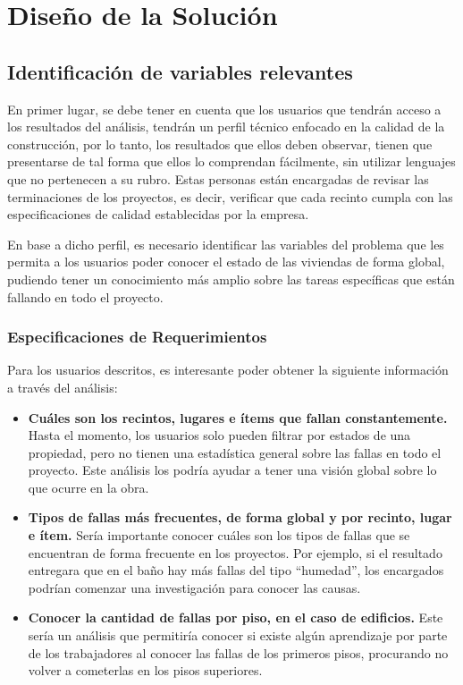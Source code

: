 \documentclass[letter,12pt,oneside]{report}
\begin{document}
\newpage
\chapter{Diseño de la Solución}

\section{Identificación de variables relevantes}
En primer lugar, se debe tener en cuenta que los usuarios que tendrán acceso a los resultados del análisis, tendrán un perfil técnico enfocado en la calidad de la construcción, por lo tanto, los resultados que ellos deben observar, tienen que presentarse de tal forma que ellos lo comprendan fácilmente, sin utilizar lenguajes que no pertenecen a su rubro. Estas personas están encargadas de revisar las terminaciones de los proyectos, es decir, verificar que cada recinto cumpla con las especificaciones de calidad establecidas por la empresa.

En base a dicho perfil, es necesario identificar las variables del problema que les permita a los usuarios poder conocer el estado de las viviendas de forma global, pudiendo tener un conocimiento más amplio sobre las tareas específicas que están fallando en todo el proyecto.

\subsection{Especificaciones de Requerimientos}
Para los usuarios descritos, es interesante poder obtener la siguiente información a través del análisis:

\begin{itemize}
\item \textbf{Cuáles son los recintos, lugares e ítems que fallan constantemente.} Hasta el momento, los usuarios solo pueden filtrar por estados de una propiedad, pero no tienen una estadística general sobre las fallas en todo el proyecto. Este análisis los podría ayudar a tener una visión global sobre lo que ocurre en la obra.
\item \textbf{Tipos de fallas más frecuentes, de forma global y por recinto, lugar e ítem.} Sería importante conocer cuáles son los tipos de fallas que se encuentran de forma frecuente en los proyectos. Por ejemplo, si el resultado entregara que en el baño hay más fallas del tipo “humedad”, los encargados podrían comenzar una investigación para conocer las causas.
\item \textbf{Conocer la cantidad de fallas por piso, en el caso de edificios.} Este sería un análisis que permitiría conocer si existe algún aprendizaje por parte de los trabajadores al conocer las fallas de los primeros pisos, procurando no volver a cometerlas en los pisos superiores.
\end{itemize}
\end{document}
